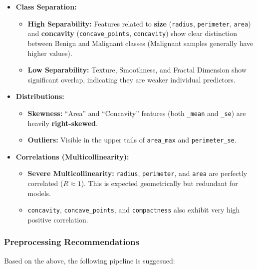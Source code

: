 \documentclass[
  letterpaper,
  DIV=11,
  numbers=noendperiod]{scrartcl}
\providecommand{\tightlist}{%
  \setlength{\itemsep}{0pt}\setlength{\parskip}{0pt}}
\begin{document}
\begin{itemize}
\tightlist
\item
  \textbf{Class Separation:}

  \begin{itemize}
  \tightlist
  \item
    \textbf{High Separability:} Features related to \textbf{size}
    (\texttt{radius}, \texttt{perimeter}, \texttt{area}) and
    \textbf{concavity} (\texttt{concave\_points}, \texttt{concavity})
    show clear distinction between Benign and Malignant classes
    (Malignant samples generally have higher values).
  \item
    \textbf{Low Separability:} Texture, Smoothness, and Fractal
    Dimension show significant overlap, indicating they are weaker
    individual predictors.
  \end{itemize}
\item
  \textbf{Distributions:}

  \begin{itemize}
  \tightlist
  \item
    \textbf{Skewness:} ``Area'' and ``Concavity'' features (both
    \texttt{\_mean} and \texttt{\_se}) are heavily
    \textbf{right-skewed}.
  \item
    \textbf{Outliers:} Visible in the upper tails of \texttt{area\_max}
    and \texttt{perimeter\_se}.
  \end{itemize}
\item
  \textbf{Correlations (Multicollinearity):}

  \begin{itemize}
  \tightlist
  \item
    \textbf{Severe Multicollinearity:} \texttt{radius},
    \texttt{perimeter}, and \texttt{area} are perfectly correlated
    (\(R \approx 1\)). This is expected geometrically but redundant for
    models.
  \item
    \texttt{concavity}, \texttt{concave\_points}, and
    \texttt{compactness} also exhibit very high positive correlation.
  \end{itemize}
\end{itemize}

\subsubsection{Preprocessing
Recommendations}\label{preprocessing-recommendations}

Based on the above, the following pipeline is suggesued:
\end{document}
